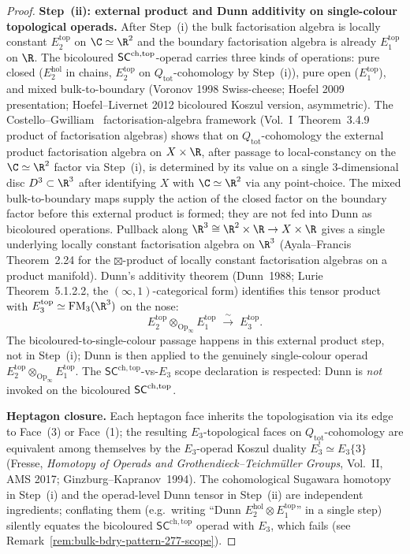 \begin{proof}
\medskip\noindent\textbf{Step~(ii): external product and Dunn
additivity on single-colour topological operads.} After Step~(i) the bulk
factorisation algebra is locally constant $E_2^{\mathrm{top}}$ on
$\C\simeq\R^2$ and the boundary factorisation algebra is already
$E_1^{\mathrm{top}}$ on $\R$. The bicoloured $\mathsf{SC}^{\mathrm{ch},\mathrm{top}}$-operad
carries three kinds of operations: pure closed ($E_2^{\mathrm{hol}}$
in chains, $E_2^{\mathrm{top}}$ on $Q_{\mathrm{tot}}$-cohomology by
Step~(i)), pure open ($E_1^{\mathrm{top}}$), and mixed
bulk-to-boundary (Voronov 1998 Swiss-cheese; Hoefel 2009 presentation;
Hoefel--Livernet 2012 bicoloured Koszul version, asymmetric). The
Costello--Gwilliam~\cite{CG21} factorisation-algebra framework
(Vol.~I~Theorem~3.4.9 product of factorisation algebras) shows that
on $Q_{\mathrm{tot}}$-cohomology the external product factorisation algebra
on $X\times\R$, after passage to local-constancy on the
$\C\simeq\R^2$ factor via Step~(i), is determined by its value on
a single $3$-dimensional disc $D^3\subset\R^3$ after identifying
$X$ with $\C\simeq\R^2$ via any point-choice. The mixed
bulk-to-boundary maps supply the action of the closed factor on the
boundary factor before this external product is formed; they are not
fed into Dunn as bicoloured operations. Pullback along
$\R^3\cong\R^2\times\R\to X\times\R$ gives a single underlying
locally constant factorisation algebra on $\R^3$
(Ayala--Francis~\cite{AF15}\,Theorem~2.24 for the $\boxtimes$-product
of locally constant factorisation algebras on a product manifold).
Dunn's additivity
theorem (Dunn~1988; Lurie~\cite{HA}\,Theorem~5.1.2.2, the
$(\infty,1)$-categorical form) identifies this tensor product with
$E_3^{\mathrm{top}}\simeq\FM_3(\R^3)$ on the nose:
\[
 E_2^{\mathrm{top}}\otimes_{\mathrm{Op}_{\infty}}E_1^{\mathrm{top}}
 \;\xrightarrow{\;\sim\;}\;
 E_3^{\mathrm{top}}.
\]
The bicoloured-to-single-colour passage happens in this external
product step, not in Step~(i); Dunn is then applied to the genuinely
single-colour operad
$E_2^{\mathrm{top}}\otimes_{\mathrm{Op}_\infty} E_1^{\mathrm{top}}$.
The $\mathsf{SC}^{\mathrm{ch,top}}$-vs-$E_3$ scope declaration is
respected: Dunn is \emph{not} invoked on the bicoloured
$\mathsf{SC}^{\mathrm{ch},\mathrm{top}}$.

\medskip\noindent\textbf{Heptagon closure.}
Each heptagon face inherits the topologisation via its edge to
Face~(3) or Face~(1); the resulting $E_3$-topological faces on
$Q_{\mathrm{tot}}$-cohomology are equivalent among themselves by the
$E_3$-operad Koszul duality
$E_3^!\simeq E_3\{3\}$ (Fresse, \emph{Homotopy of Operads and
Grothendieck--Teichm\"uller Groups}, Vol.~II, AMS 2017;
Ginzburg--Kapranov~1994). The cohomological Sugawara homotopy in
Step~(i) and the operad-level Dunn tensor in Step~(ii) are independent
ingredients; conflating them (e.g.\ writing
``Dunn $E_2^{\mathrm{hol}}\otimes E_1^{\mathrm{top}}$'' in a single
step) silently equates the bicoloured $\mathsf{SC}^{\mathrm{ch,top}}$
operad with $E_3$, which fails (see
Remark~\ref{rem:bulk-bdry-pattern-277-scope}).
\end{proof}

